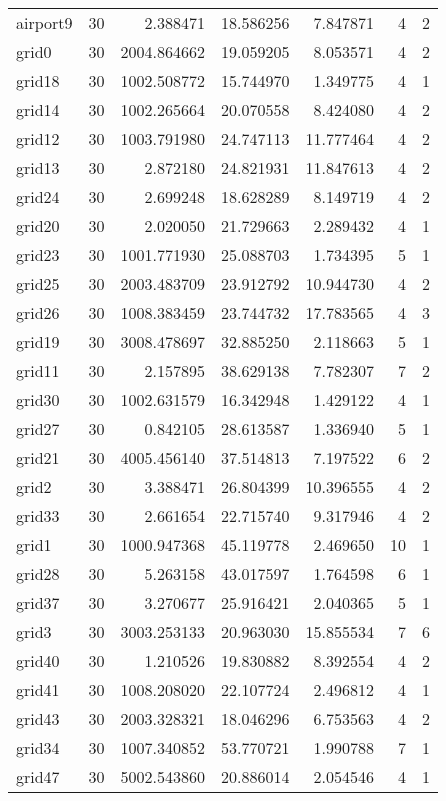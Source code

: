 \begin{longtable}{|l|r|r|r|r|r|r|}
airport9 & 30 & 2.388471 & 18.586256 & 7.847871 & 4 & 2 \\
grid0 & 30 & 2004.864662 & 19.059205 & 8.053571 & 4 & 2 \\
grid18 & 30 & 1002.508772 & 15.744970 & 1.349775 & 4 & 1 \\
grid14 & 30 & 1002.265664 & 20.070558 & 8.424080 & 4 & 2 \\
grid12 & 30 & 1003.791980 & 24.747113 & 11.777464 & 4 & 2 \\
grid13 & 30 & 2.872180 & 24.821931 & 11.847613 & 4 & 2 \\
grid24 & 30 & 2.699248 & 18.628289 & 8.149719 & 4 & 2 \\
grid20 & 30 & 2.020050 & 21.729663 & 2.289432 & 4 & 1 \\
grid23 & 30 & 1001.771930 & 25.088703 & 1.734395 & 5 & 1 \\
grid25 & 30 & 2003.483709 & 23.912792 & 10.944730 & 4 & 2 \\
grid26 & 30 & 1008.383459 & 23.744732 & 17.783565 & 4 & 3 \\
grid19 & 30 & 3008.478697 & 32.885250 & 2.118663 & 5 & 1 \\
grid11 & 30 & 2.157895 & 38.629138 & 7.782307 & 7 & 2 \\
grid30 & 30 & 1002.631579 & 16.342948 & 1.429122 & 4 & 1 \\
grid27 & 30 & 0.842105 & 28.613587 & 1.336940 & 5 & 1 \\
grid21 & 30 & 4005.456140 & 37.514813 & 7.197522 & 6 & 2 \\
grid2 & 30 & 3.388471 & 26.804399 & 10.396555 & 4 & 2 \\
grid33 & 30 & 2.661654 & 22.715740 & 9.317946 & 4 & 2 \\
grid1 & 30 & 1000.947368 & 45.119778 & 2.469650 & 10 & 1 \\
grid28 & 30 & 5.263158 & 43.017597 & 1.764598 & 6 & 1 \\
grid37 & 30 & 3.270677 & 25.916421 & 2.040365 & 5 & 1 \\
grid3 & 30 & 3003.253133 & 20.963030 & 15.855534 & 7 & 6 \\
grid40 & 30 & 1.210526 & 19.830882 & 8.392554 & 4 & 2 \\
grid41 & 30 & 1008.208020 & 22.107724 & 2.496812 & 4 & 1 \\
grid43 & 30 & 2003.328321 & 18.046296 & 6.753563 & 4 & 2 \\
grid34 & 30 & 1007.340852 & 53.770721 & 1.990788 & 7 & 1 \\
grid47 & 30 & 5002.543860 & 20.886014 & 2.054546 & 4 & 1 \\

\end{longtable}
